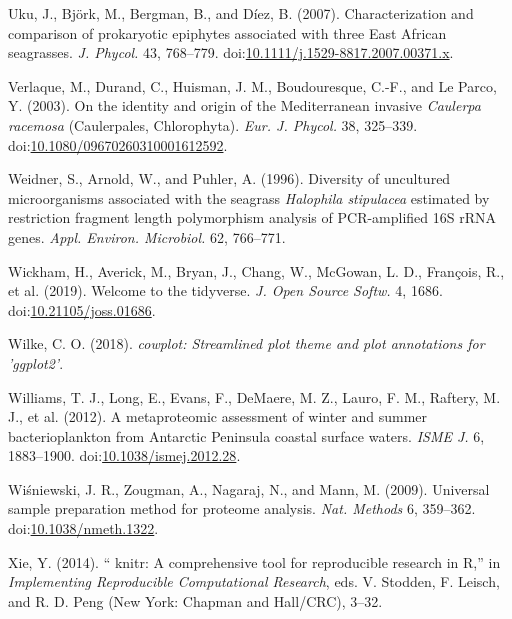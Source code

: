 \documentclass[12pt,]{article}
\begin{document}
\leavevmode\hypertarget{ref-Uku2007}{}%
Uku, J., Björk, M., Bergman, B., and Díez, B. (2007). Characterization
and comparison of prokaryotic epiphytes associated with three East
African seagrasses. \emph{J. Phycol.} 43, 768--779.
doi:\href{https://doi.org/10.1111/j.1529-8817.2007.00371.x}{10.1111/j.1529-8817.2007.00371.x}.

\leavevmode\hypertarget{ref-Verlaque2003}{}%
Verlaque, M., Durand, C., Huisman, J. M., Boudouresque, C.-F., and Le
Parco, Y. (2003). On the identity and origin of the Mediterranean
invasive \emph{Caulerpa racemosa} (Caulerpales, Chlorophyta). \emph{Eur.
J. Phycol.} 38, 325--339.
doi:\href{https://doi.org/10.1080/09670260310001612592}{10.1080/09670260310001612592}.

\leavevmode\hypertarget{ref-Weidner1996}{}%
Weidner, S., Arnold, W., and Puhler, A. (1996). Diversity of uncultured
microorganisms associated with the seagrass \emph{Halophila stipulacea}
estimated by restriction fragment length polymorphism analysis of
PCR-amplified 16S rRNA genes. \emph{Appl. Environ. Microbiol.} 62,
766--771.

\leavevmode\hypertarget{ref-Wickham2019}{}%
Wickham, H., Averick, M., Bryan, J., Chang, W., McGowan, L. D.,
François, R., et al. (2019). Welcome to the tidyverse. \emph{J. Open
Source Softw.} 4, 1686.
doi:\href{https://doi.org/10.21105/joss.01686}{10.21105/joss.01686}.

\leavevmode\hypertarget{ref-Wilke2018}{}%
Wilke, C. O. (2018). \emph{cowplot: Streamlined plot theme and plot
annotations for 'ggplot2'}.

\leavevmode\hypertarget{ref-Williams2012}{}%
Williams, T. J., Long, E., Evans, F., DeMaere, M. Z., Lauro, F. M.,
Raftery, M. J., et al. (2012). A metaproteomic assessment of winter and
summer bacterioplankton from Antarctic Peninsula coastal surface waters.
\emph{ISME J.} 6, 1883--1900.
doi:\href{https://doi.org/10.1038/ismej.2012.28}{10.1038/ismej.2012.28}.

\leavevmode\hypertarget{ref-Wisniewski2009}{}%
Wiśniewski, J. R., Zougman, A., Nagaraj, N., and Mann, M. (2009).
Universal sample preparation method for proteome analysis. \emph{Nat.
Methods} 6, 359--362.
doi:\href{https://doi.org/10.1038/nmeth.1322}{10.1038/nmeth.1322}.

\leavevmode\hypertarget{ref-Xie2014}{}%
Xie, Y. (2014). `` knitr: A comprehensive tool for reproducible research
in R,'' in \emph{Implementing Reproducible Computational Research}, eds.
V. Stodden, F. Leisch, and R. D. Peng (New York: Chapman and Hall/CRC),
3--32.
\end{document}
